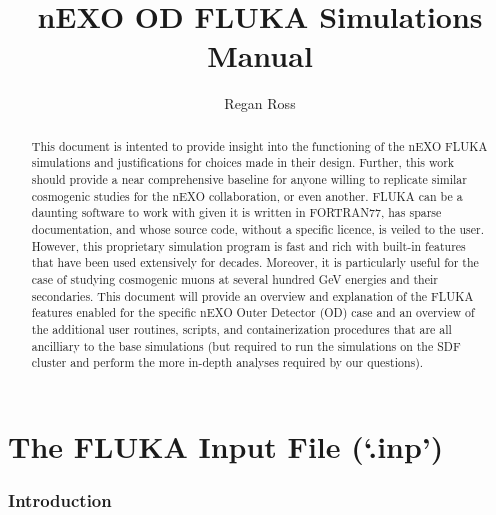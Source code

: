 \documentclass[10pt]{article}
\title{nEXO OD FLUKA Simulations Manual}
\author{Regan Ross}
\begin{document}
\begin{titlepage}
    \maketitle
    \vspace{4cm}
    \centering
\end{titlepage}

\begin{abstract}
    This document is intented to provide insight into the functioning of the nEXO FLUKA simulations and justifications for choices made in their design. Further, this work should provide a near comprehensive baseline for anyone willing to replicate similar cosmogenic studies for the nEXO collaboration, or even another. FLUKA can be a daunting software to work with given it is written in FORTRAN77, has sparse documentation, and whose source code, without a specific licence, is veiled to the user. However, this proprietary simulation program is fast and rich with built-in features that have been used extensively for decades. Moreover, it is particularly useful for the case of studying cosmogenic muons at several hundred GeV energies and their secondaries. This document will provide an overview and explanation of the FLUKA features enabled for the specific nEXO Outer Detector (OD) case and an overview of the additional user routines, scripts, and containerization procedures that are all ancilliary to the base simulations (but required to run the simulations on the SDF cluster and perform the more in-depth analyses required by our questions).
\end{abstract}


\vspace{1.5cm}
\listoffigures

\newpage
\tableofcontents

\break
\part*{The FLUKA Input File (`.inp')}
\section{Introduction}
\end{document}

